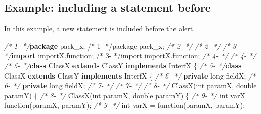 \documentclass[
]{article}
\newenvironment{Shaded}{\begin{snugshade}}{\end{snugshade}}
\newcommand{\CommentTok}[1]{\textcolor[rgb]{0.56,0.35,0.01}{\textit{#1}}}
\newcommand{\DataTypeTok}[1]{\textcolor[rgb]{0.13,0.29,0.53}{#1}}
\newcommand{\FunctionTok}[1]{\textcolor[rgb]{0.00,0.00,0.00}{#1}}
\newcommand{\ImportTok}[1]{#1}
\newcommand{\KeywordTok}[1]{\textcolor[rgb]{0.13,0.29,0.53}{\textbf{#1}}}
\newcommand{\NormalTok}[1]{#1}
\begin{document}
\begin{landscape}

\subsection{Example: including a statement before} \label{example_including_statement}

\small

\normalsize

In this example, a new statement is included before the alert.

\small

\normalsize

\scriptsize

\begin{Shaded}
\begin{Highlighting}[]
\CommentTok{/*  1-   */}\KeywordTok{package}\ImportTok{ pack_x;                                          /*  1-   */package pack_x;}                                          
\CommentTok{/*  2-   */}                                                         \CommentTok{/*  2-   */}                                                         
\CommentTok{/*  3-   */}\KeywordTok{import}\ImportTok{ importX.function;                                 /*  3-   */import importX.function;}                                 
\CommentTok{/*  4-   */}                                                         \CommentTok{/*  4-   */}                                                         
\CommentTok{/*  5-   */}\KeywordTok{class}\NormalTok{ ClassX }\KeywordTok{extends}\NormalTok{ ClassY }\KeywordTok{implements}\NormalTok{ InterfX \{         }\CommentTok{/*  5-   */}\KeywordTok{class}\NormalTok{ ClassX }\KeywordTok{extends}\NormalTok{ ClassY }\KeywordTok{implements}\NormalTok{ InterfX \{         }
\CommentTok{/*  6-   */}    \KeywordTok{private} \DataTypeTok{long}\NormalTok{ fieldX;                                 }\CommentTok{/*  6-   */}    \KeywordTok{private} \DataTypeTok{long}\NormalTok{ fieldX;                                 }
\CommentTok{/*  7-   */}                                                         \CommentTok{/*  7-   */}                                                         
\CommentTok{/*  8-   */}    \FunctionTok{ClassX}\NormalTok{(}\DataTypeTok{int}\NormalTok{ paramX, }\DataTypeTok{double}\NormalTok{ paramY) \{                        }\CommentTok{/*  8-   */}    \FunctionTok{ClassX}\NormalTok{(}\DataTypeTok{int}\NormalTok{ paramX, }\DataTypeTok{double}\NormalTok{ paramY) \{                          }
\CommentTok{/*  9-   */}        \DataTypeTok{int}\NormalTok{ varX = }\FunctionTok{function}\NormalTok{(paramX, paramY);                  }\CommentTok{/*  9-   */}        \DataTypeTok{int}\NormalTok{ varX = }\FunctionTok{function}\NormalTok{(paramX, paramY);                     }

\end{Highlighting}
\end{Shaded}
\end{landscape}
\end{document}
